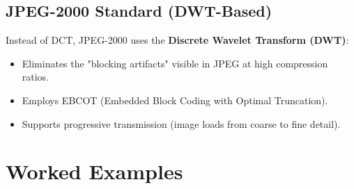 \documentclass[12pt,a4paper]{article}
\begin{document}
\subsection{JPEG-2000 Standard (DWT-Based)}
Instead of DCT, JPEG-2000 uses the \textbf{Discrete Wavelet Transform (DWT)}:
\begin{itemize}[leftmargin=*, itemsep=2.5pt]
  \item Eliminates the "blocking artifacts" visible in JPEG at high compression ratios.
  \item Employs EBCOT (Embedded Block Coding with Optimal Truncation).
  \item Supports progressive transmission (image loads from coarse to fine detail).
\end{itemize}

\section{Worked Examples}
\end{document}
